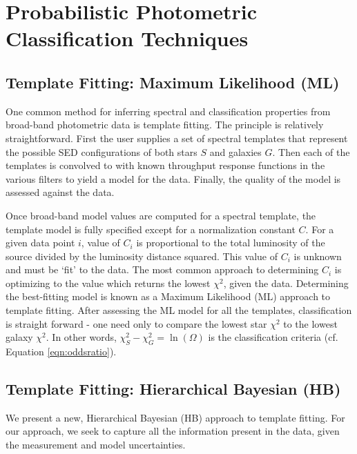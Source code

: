 \documentclass[12pt,preprint]{aastex}
\begin{document}
%
%
\section{Probabilistic Photometric Classification Techniques}



\subsection{Template Fitting: Maximum Likelihood (ML)}
\label{ssec:MLmethod}

One common method for inferring spectral and classification properties 
from broad-band photometric data is template fitting.  The principle is 
relatively straightforward. First the user supplies a set of spectral templates 
that represent the possible SED configurations of both stars $S$ and 
galaxies $G$.  Then each of the templates is convolved to with known 
throughput response functions in the various filters to yield a model for 
the data.  Finally, the quality of the model is assessed against the data.  

Once broad-band model values are computed for a spectral template, the 
template model is fully specified except for a normalization constant $C$.  
For a given data point $i$, value of $C_i$ is proportional to 
the total luminosity of the source divided by the luminosity distance 
squared.  This value of $C_i$ is unknown and must be `fit' to the data.  The 
most common approach to determining $C_i$ is optimizing to the value 
which returns the lowest $\chi^2$, given the data.  Determining the best-fitting 
model is known as a Maximum Likelihood (ML) approach to template fitting.  
After assessing the ML model for all the templates, classification is straight forward - 
one need only to compare the lowest star $\chi^2$ to the lowest galaxy 
$\chi^2$.  In other words, $\chi^2_S-\chi^2_G=\ln(\Omega)$ is the classification 
criteria (cf. Equation \ref{eqn:oddsratio}).  

\subsection{Template Fitting: Hierarchical Bayesian (HB)}
\label{ssec:HBmethod}

We present a new, Hierarchical Bayesian (HB) approach to template fitting.  For our 
approach, we seek to capture all the information present in the data, given the 
measurement and model uncertainties.  
\end{document}
